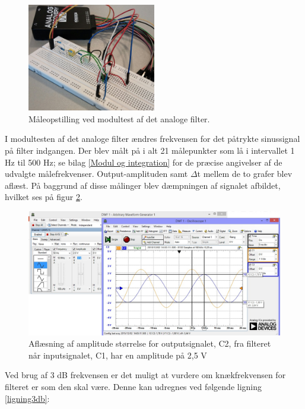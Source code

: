 \begin{figure}[H]
	\centering
	\includegraphics[width=0.5\textwidth]{Figurer/Hardware/FilterTest}
	\caption{Måleopstilling ved modultest af det analoge filter.}
	\label{fig:FilterTest}
\end{figure}

I modultesten af det analoge filter ændres frekvensen for det påtrykte sinussignal på filter indgangen. Der blev målt på i alt 21 målepunkter som lå i intervallet 1 Hz til 500 Hz; se bilag \ref{Modul og integration} for de præcise angivelser af de udvalgte målefrekvenser. Output-amplituden samt $\Delta$t mellem de to grafer blev aflæst. På baggrund af disse målinger blev dæmpningen af signalet afbildet, hvilket ses på figur \ref{fig:FilterAmplitude}. 

\begin{figure}[H]
	\centering
	\includegraphics[width=1\textwidth]{Figurer/Hardware/AnalogScreenFilterAmp}
	\caption{Aflæsning af amplitude størrelse for outputsignalet, C2, fra filteret når inputsignalet, C1, har en amplitude på 2,5 V}
	\label{fig:FilterAmplitude}
\end{figure}

Ved brug af 3 dB frekvensen er det muligt at vurdere om knækfrekvensen for filteret er som den skal være. Denne kan udregnes ved følgende ligning \ref{ligning3db}:

